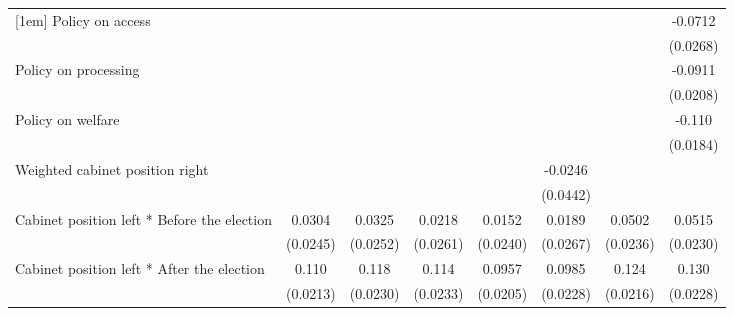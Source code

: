 \begin{table}[htbp]
\begin{tabular}{l*{7}{c}}
[1em]
Policy on access    &                     &                     &                     &                     &                     &                     &     -0.0712\sym{*}  \\
                    &                     &                     &                     &                     &                     &                     &    (0.0268)         \\
[1em]
Policy on processing&                     &                     &                     &                     &                     &                     &     -0.0911\sym{***}\\
                    &                     &                     &                     &                     &                     &                     &    (0.0208)         \\
[1em]
Policy on welfare   &                     &                     &                     &                     &                     &                     &      -0.110\sym{***}\\
                    &                     &                     &                     &                     &                     &                     &    (0.0184)         \\
[1em]
Weighted cabinet position right&                     &                     &                     &                     &     -0.0246         &                     &                     \\
                    &                     &                     &                     &                     &    (0.0442)         &                     &                     \\
[1em]
Cabinet position left * Before the election&      0.0304         &      0.0325         &      0.0218         &      0.0152         &      0.0189         &      0.0502\sym{*}  &      0.0515\sym{*}  \\
                    &    (0.0245)         &    (0.0252)         &    (0.0261)         &    (0.0240)         &    (0.0267)         &    (0.0236)         &    (0.0230)         \\
[1em]
Cabinet position left * After the election&       0.110\sym{***}&       0.118\sym{***}&       0.114\sym{***}&      0.0957\sym{***}&      0.0985\sym{***}&       0.124\sym{***}&       0.130\sym{***}\\
                    &    (0.0213)         &    (0.0230)         &    (0.0233)         &    (0.0205)         &    (0.0228)         &    (0.0216)         &    (0.0228)         \\

\end{tabular}
\end{table}
